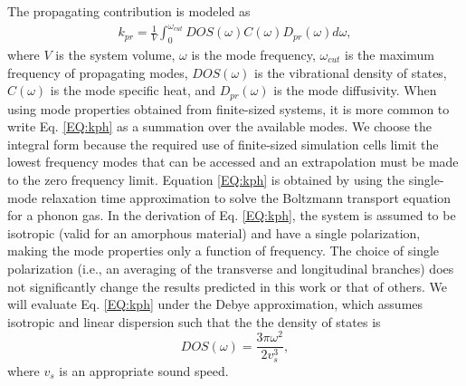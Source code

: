 \documentclass[aps,prb,twocolumn,superscriptaddress,footinbib,amsmath,amssymb,floatfix]{revtex4}
\begin{document}
The propagating contribution is modeled as
\cite{feldman_thermal_1993,feldman_numerical_1999} 
\begin{equation}\label{EQ:kph}
\begin{split}
k_{pr} = \frac{1}{V}\int_{0}^{\omega_{cut}} 
DOS(\omega) C(\omega) D_{pr}(\omega)d\omega,
\end{split}
\end{equation}
where $V$ is the system volume, $\omega$ is the mode 
frequency, $\omega_{cut}$ is the maximum frequency of propagating 
modes,  
$DOS(\omega)$ is the vibrational 
density of states, $C(\omega)$ is the mode specific heat, 
and $D_{pr}(\omega)$ is the mode diffusivity. When using mode 
properties obtained from finite-sized systems, it is more common 
to write Eq. \eqref{EQ:kph} as a summation over the available modes. 
We choose the integral form because the required use of finite-sized 
simulation cells limit the lowest frequency 
modes that can be accessed and an extrapolation 
must be made to the zero frequency limit.
\cite{love_estimate_1990,feldman_thermal_1993,cahill_thermal_1994,
feldman_numerical_1999,baldi_thermal_2008,
liu_high_2009,yang_anomalously_2010}    
Equation \eqref{EQ:kph} is obtained by using the single-mode relaxation
time approximation to solve 
the Boltzmann transport equation for a phonon gas.
\cite{ziman_electrons_2001} In the derivation of Eq. 
\eqref{EQ:kph}, the system is assumed to be isotropic 
(valid for an amorphous material) 
and have a single polarization,\cite{dove_introduction_1993} 
making the mode properties only a function of frequency. The 
choice of single polarization (i.e., an averaging 
of the transverse and longitudinal branches) 
does not significantly change the results predicted in this work  
or that of others.
\cite{feldman_thermal_1993,cahill_thermal_1994,
feldman_numerical_1999,baldi_thermal_2008,liu_high_2009,
yang_anomalously_2010} 
We will evaluate Eq. \eqref{EQ:kph} under the Debye approximation, 
which assumes isotropic and linear dispersion such that the 
the density of states is
\begin{equation}\label{EQ:DOS_debye}
DOS(\omega) = \frac{3\pi\omega^2}{2v_{s}^3},
\end{equation}
where $v_s$ is an appropriate sound speed.\cite{ashcroft_solid_1976} 
\end{document}
